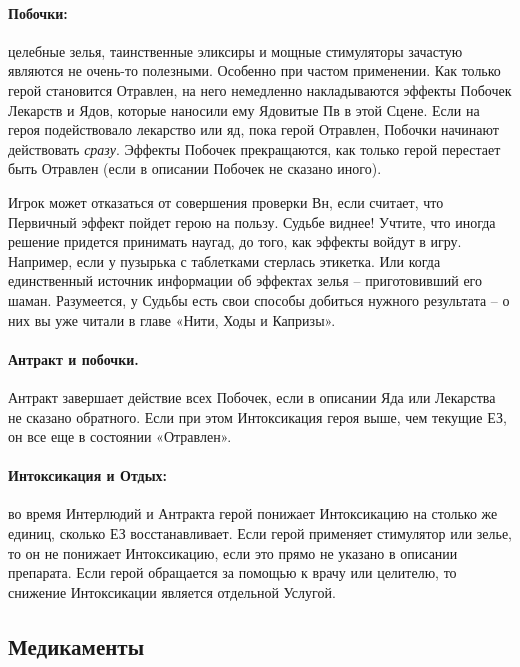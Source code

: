 \paragraph{Побочки:} целебные зелья, таинственные эликсиры и мощные стимуляторы зачастую являются не очень-то полезными. Особенно при частом применении. 
\newline Как только герой становится Отравлен, на него немедленно накладываются эффекты Побочек Лекарств и Ядов, которые наносили ему Ядовитые Пв в этой Сцене. 
\newline Если на героя подействовало лекарство или яд, пока герой Отравлен, Побочки начинают действовать \textit{сразу}.
\newline Эффекты Побочек прекращаются, как только герой перестает быть Отравлен (если в описании Побочек не сказано иного).
\begin{tcolorbox}
    Игрок может отказаться от совершения проверки Вн, если считает, что Первичный эффект пойдет герою на пользу. Судьбе виднее! Учтите, что иногда решение придется принимать наугад, до того, как эффекты войдут в игру. Например, если у пузырька с таблетками стерлась этикетка. Или когда единственный источник информации об эффектах зелья – приготовивший его шаман. Разумеется, у Судьбы есть свои способы добиться нужного результата – о них вы уже читали в главе «Нити, Ходы и Капризы».
\end{tcolorbox}
\paragraph{Антракт и побочки.} Антракт завершает действие всех Побочек, если в описании Яда или Лекарства не сказано обратного. Если при этом Интоксикация героя выше, чем текущие ЕЗ, он все еще в состоянии «Отравлен».
\paragraph{Интоксикация и Отдых:} во время Интерлюдий и Антракта герой понижает Интоксикацию на столько же единиц, сколько ЕЗ восстанавливает. Если герой применяет стимулятор или зелье, то он не понижает Интоксикацию, если это прямо не указано в описании препарата. 
\newline Если герой обращается за помощью к врачу или целителю, то снижение Интоксикации является отдельной Услугой. 

\subsection{Медикаменты}

